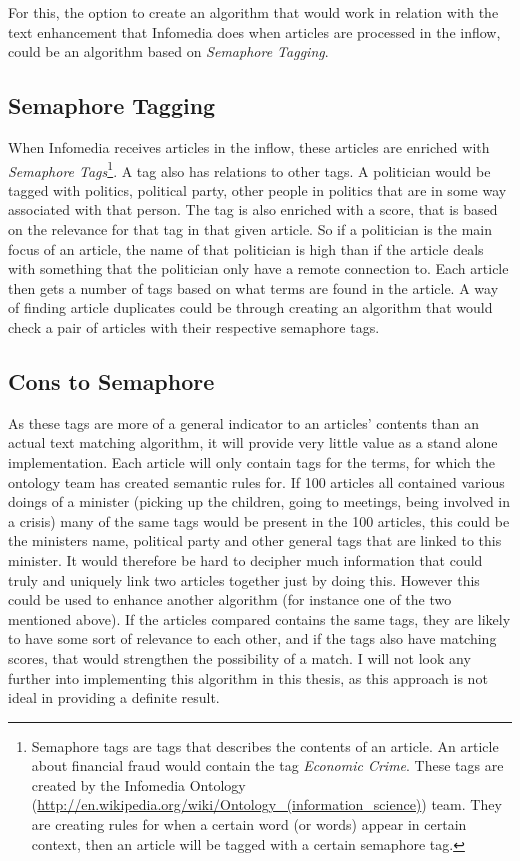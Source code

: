 For this, the option to create an algorithm that would work in relation with the text enhancement that Infomedia does when articles are processed in the inflow, could be an algorithm based on \textit{Semaphore Tagging}.

\subsection{Semaphore Tagging}
When Infomedia receives articles in the inflow, these articles are enriched with \textit{Semaphore Tags}\footnote{Semaphore tags are tags that describes the contents of an article. An article about financial fraud would contain the tag \textit{Economic Crime}. These tags are created by the Infomedia Ontology (\url{http://en.wikipedia.org/wiki/Ontology_(information_science)}) team. They are creating rules for when a certain word (or words) appear in certain context, then an article will be tagged with a certain semaphore tag.}. A tag also has relations to other tags. A politician would be tagged with politics, political party, other people in politics that are in some way associated with that person. The tag is also enriched with a score, that is based on the relevance for that tag in that given article. So if a politician is the main focus of an article, the name of that politician is high than if the article deals with something that the politician only have a remote connection to. Each article then gets a number of tags based on what terms are found in the article. A way of finding article duplicates could be through creating an algorithm that would check a pair of articles with their respective semaphore tags.

\subsection{Cons to Semaphore}
As these tags are more of a general indicator to an articles' contents than an actual text matching algorithm, it will provide very little value as a stand alone implementation. Each article will only contain tags for the terms, for which the ontology team has created semantic rules for. If 100 articles all contained various doings of a minister (picking up the children, going to meetings, being involved in a crisis) many of the same tags would be present in the 100 articles, this could be the ministers name, political party and other general tags that are linked to this minister. It would therefore be hard to decipher much information that could truly and uniquely link two articles together just by doing this. However this could be used to enhance another algorithm (for instance one of the two mentioned above). If the articles compared contains the same tags, they are likely to have some sort of relevance to each other, and if the tags also have matching scores, that would strengthen the possibility of a match. I will not look any further into implementing this algorithm in this thesis, as this approach is not ideal in providing a definite result.

